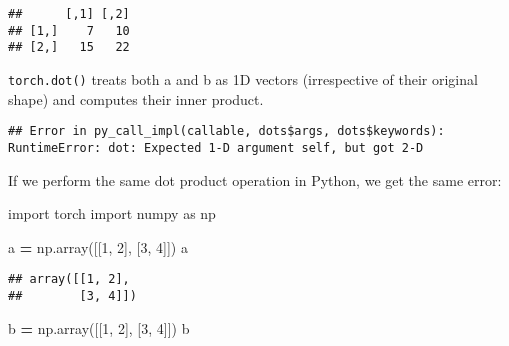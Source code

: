 \documentclass[]{book}
\newenvironment{Shaded}{\begin{snugshade}}{\end{snugshade}}
\newcommand{\CommentTok}[1]{\textcolor[rgb]{0.56,0.35,0.01}{\textit{#1}}}
\newcommand{\DecValTok}[1]{\textcolor[rgb]{0.00,0.00,0.81}{#1}}
\newcommand{\ImportTok}[1]{#1}
\newcommand{\KeywordTok}[1]{\textcolor[rgb]{0.13,0.29,0.53}{\textbf{#1}}}
\newcommand{\NormalTok}[1]{#1}
\newcommand{\OperatorTok}[1]{\textcolor[rgb]{0.81,0.36,0.00}{\textbf{#1}}}
\newcommand{\StringTok}[1]{\textcolor[rgb]{0.31,0.60,0.02}{#1}}
\begin{document}
\begin{verbatim}
##      [,1] [,2]
## [1,]    7   10
## [2,]   15   22
\end{verbatim}

\texttt{torch.dot()} treats both a and b as 1D vectors (irrespective of their original shape) and computes their inner product.

\begin{Shaded}
\end{Shaded}

\begin{verbatim}
## Error in py_call_impl(callable, dots$args, dots$keywords): RuntimeError: dot: Expected 1-D argument self, but got 2-D
\end{verbatim}

\begin{Shaded}
\end{Shaded}

If we perform the same dot product operation in Python, we get the same error:

\begin{Shaded}
\begin{Highlighting}[]
\ImportTok{import}\NormalTok{ torch}
\ImportTok{import}\NormalTok{ numpy }\ImportTok{as}\NormalTok{ np}

\NormalTok{a }\OperatorTok{=}\NormalTok{ np.array([[}\DecValTok{1}\NormalTok{, }\DecValTok{2}\NormalTok{], [}\DecValTok{3}\NormalTok{, }\DecValTok{4}\NormalTok{]])}
\NormalTok{a}
\end{Highlighting}
\end{Shaded}

\begin{verbatim}
## array([[1, 2],
##        [3, 4]])
\end{verbatim}

\begin{Shaded}
\begin{Highlighting}[]
\NormalTok{b }\OperatorTok{=}\NormalTok{ np.array([[}\DecValTok{1}\NormalTok{, }\DecValTok{2}\NormalTok{], [}\DecValTok{3}\NormalTok{, }\DecValTok{4}\NormalTok{]])}
\NormalTok{b}
\end{Highlighting}
\end{Shaded}
\end{document}
